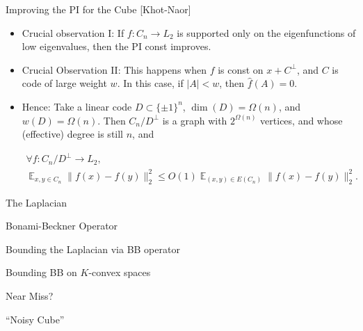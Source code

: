 \documentclass[compress]{beamer}
\DeclareMathOperator*{\Avg}{\mathbb{E}}
\begin{document}
\begin{frame}{Improving the PI for the Cube [Khot-Naor]}
\begin{itemize}[<+->]
\item Crucial observation I:
If $f:C_n \to L_2$ is supported only on the eigenfunctions of low eigenvalues, then the PI const improves.

\item Crucial Observation II:
This happens when $f$ is const on $x+C^\bot$, and $C$ is code of large weight $w$. In this case, if $|A|<w$, then $\hat f(A)=0$.

\item Hence: Take a linear code $D\subset \{\pm 1\}^n$, $\dim(D)=\Omega(n)$, and $w(D)=\Omega(n)$.
Then $C_n/D^\bot$ is a graph with $2^{\Omega(n)}$ vertices, and whose (effective) degree is still $n$,
and

\begin{multline*} \forall f:C_n/D^\bot \to L_2,\\  
\Avg_{x,y\in C_n}\|f(x)-f(y)\|_2^2 \le O({1}) \!\!\Avg_{(x,y)\in E(C_n)} \!\! \|f(x)- f(y)\|_2^2 .
\end{multline*}

\end{itemize}
\end{frame}


\begin{frame}{The Laplacian}

\end{frame}

\begin{frame}{Bonami-Beckner Operator}

\end{frame}

\begin{frame}{Bounding the Laplacian via BB operator}

\end{frame}

\begin{frame}{Bounding BB on $K$-convex spaces}

\end{frame}

\begin{frame}{Near Miss?}

\end{frame}

\begin{frame}{``Noisy Cube''}

\end{frame}
\end{document}
